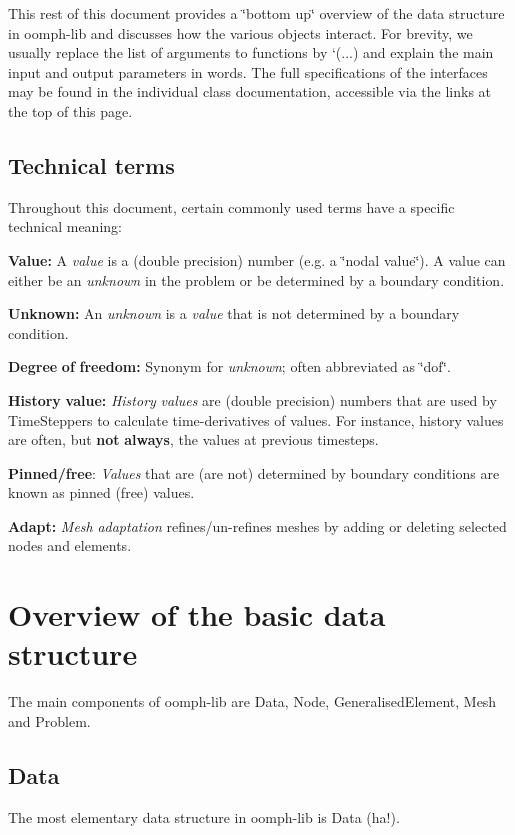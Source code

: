 This rest of this document provides a \char`\"{}bottom up\char`\"{} overview of the data structure in {\ttfamily oomph-\/lib} and discusses how the various objects interact. For brevity, we usually replace the list of arguments to functions by `(...)\textquotesingle{} and explain the main input and output parameters in words. The full specifications of the interfaces may be found in the individual class documentation, accessible via the links at the top of this page.\hypertarget{index_technical_terms}{}\subsection{Technical terms}\label{index_technical_terms}
Throughout this document, certain commonly used terms have a specific technical meaning\+:
\begin{DoxyItemize}
\item {\bfseries Value\+:} A {\itshape value} is a (double precision) number (e.\+g. a \char`\"{}nodal 
   value\char`\"{}). A value can either be an {\itshape unknown} in the problem or be determined by a boundary condition.
\item {\bfseries Unknown\+:} An {\itshape unknown} is a {\itshape value} that is not determined by a boundary condition.
\item {\bfseries Degree} {\bfseries of} {\bfseries freedom\+:} Synonym for {\itshape unknown}; often abbreviated as \char`\"{}dof\char`\"{}.
\item {\bfseries History} {\bfseries value\+:} {\itshape History} {\itshape values} are (double precision) numbers that are used by {\ttfamily Time\+Steppers} to calculate time-\/derivatives of values. For instance, history values are often, but {\bfseries not} {\bfseries always}, the values at previous timesteps.
\item {\bfseries Pinned/free}\+: {\itshape Values} that are (are not) determined by boundary conditions are known as pinned (free) values.
\item {\bfseries Adapt\+:} {\itshape Mesh} {\itshape adaptation} refines/un-\/refines meshes by adding or deleting selected nodes and elements.
\end{DoxyItemize}\hypertarget{index_general_data_structure}{}\section{Overview of the basic data structure}\label{index_general_data_structure}
The main components of {\ttfamily oomph-\/lib} are {\ttfamily Data}, {\ttfamily Node}, {\ttfamily Generalised\+Element}, {\ttfamily Mesh} and {\ttfamily Problem}.\hypertarget{index_data}{}\subsection{Data}\label{index_data}
The most elementary data structure in {\ttfamily oomph-\/lib} is {\ttfamily Data} (ha!).

